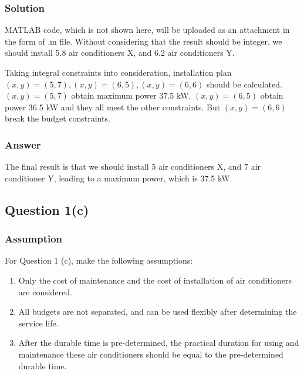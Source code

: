 \documentclass[titlepage,a4paper]{article}
\begin{document}
        \subsubsection{Solution}

            MATLAB code, which is not shown here, will be uploaded as an attachment in the form of .m file. Without considering that the result should be integer, we should install 5.8 air conditioners X, and 6.2 air conditioners Y.

            Taking integral constraints into consideration, installation plan $(x,y)=(5,7),(x,y)=(6,5),(x,y)=(6,6)$ should be calculated. $(x,y)=(5,7)$ obtain maximum power 37.5 kW, $(x,y)=(6,5)$ obtain power 36.5 kW and they all meet the other constraints. But $(x,y)=(6,6)$ break the budget constraints.


        \subsubsection{Answer}

            The final result is that we should install 5 air conditioners X, and 7 air conditioner Y, leading to a maximum power, which is 37.5 kW.

            

    \subsection{Question 1(c)}
    
        \subsubsection{Assumption}

        For Question 1 (c), make the following assumptions:

            \begin{enumerate}
                \item Only the cost of maintenance and the cost of installation of air conditioners are considered.
                \item \label{assumptions.q1c b 2} All budgets are not separated, and can be used flexibly after determining the service life.
                \item After the durable time is pre-determined, the practical duration for using and maintenance these air conditioners should  be equal to the pre-determined durable time.
            \end{enumerate}
\end{document}
